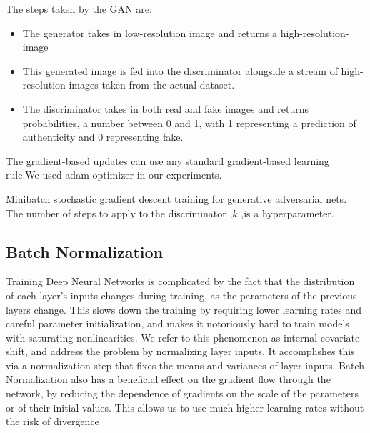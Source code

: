 The steps taken by the GAN are: 
\begin{itemize}
 \item The generator takes in low-resolution image  and returns a high-resolution-image
 \item This generated image is fed into the discriminator alongside a stream of high-resolution images taken from the actual dataset.
 \item The discriminator takes in both real and fake images and returns probabilities, a number between 0 and 1, with 1 representing a prediction of authenticity and 0 representing fake.
\end{itemize}
\begin{algorithm}[H]
\DontPrintSemicolon
{}
The gradient-based updates can use any standard gradient-based learning rule.We used adam-optimizer in our experiments.\;
\caption{Minibatch stochastic gradient descent training for generative adversarial nets. The number of steps to apply to the discriminator ,$k$ ,is a hyperparameter.}
\end{algorithm}
\subsection{Batch Normalization}
Training Deep Neural Networks is complicated by the fact that the distribution of each layer’s inputs changes during training, as the parameters of the previous layers change. This slows down the training by requiring lower learning rates and careful parameter initialization, and makes it notoriously hard to train models with saturating nonlinearities.  We refer to this phenomenon as internal covariate shift,  and  address the  problem by  normalizing layer inputs. It accomplishes  this  via  a  normalization  step  that  fixes  the
means and variances of layer inputs. Batch Normalization
also has a beneficial effect on the gradient flow through
the  network,  by  reducing  the  dependence  of  gradients
on the scale  of the parameters or of their initial values.
This  allows  us  to  use  much  higher  learning  rates  without the  risk  of  divergence

